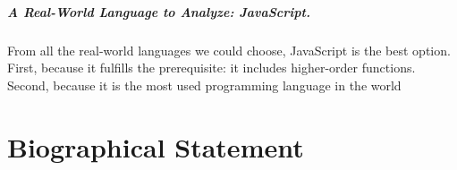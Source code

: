 \documentclass[12pt, oneside]{book}
\begin{document}
\paragraph{A Real-World Language to Analyze: JavaScript.}

From all the real-world languages we could choose, JavaScript is the best option. First, because it fulfills the prerequisite: it includes higher-order functions. Second, because it is the most used programming language in the world~\cite{stack-overflow-developer-survey, jet-brains-developer-survey}

\appendix


\backmatter




\chapter{Biographical Statement}

\end{document}
